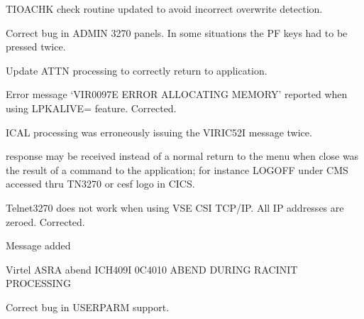 \documentclass[letterpaper,10pt,english]{sphinxmanual}
\begin{document}
\sphinxAtStartPar
{}

\sphinxAtStartPar
TIOACHK check routine updated to avoid incorrect overwrite detection.

\sphinxAtStartPar
{}

\sphinxAtStartPar
Correct bug in ADMIN 3270 panels. In some situations the PF keys had to be pressed twice.

\sphinxAtStartPar
{}

\sphinxAtStartPar
Update ATTN processing to correctly return to application.

\sphinxAtStartPar
{}

\sphinxAtStartPar
Error message ‘VIR0097E ERROR ALLOCATING MEMORY’ reported when using LPKALIVE= feature. Corrected.

\sphinxAtStartPar
{}

\sphinxAtStartPar
ICAL processing was erroneously issuing the VIRIC52I message twice.

\sphinxAtStartPar
{}

 response may be received instead of a normal return to the menu when close was the result of a command to the application; for instance LOGOFF under CMS accessed thru TN3270
or cesf logo in CICS.

\sphinxAtStartPar
{}

\sphinxAtStartPar
Telnet3270 does not work when using VSE CSI TCP/IP. All IP addresses are zeroed. Corrected.

\sphinxAtStartPar
{}

\sphinxAtStartPar
Message added

\sphinxAtStartPar
{}

\sphinxAtStartPar
Virtel ASRA abend \sphinxhyphen{} ICH409I 0C4\sphinxhyphen{}010 ABEND DURING RACINIT PROCESSING

\sphinxAtStartPar
{}

\sphinxAtStartPar
Correct bug in USERPARM support.

\sphinxAtStartPar
{}
\end{document}
